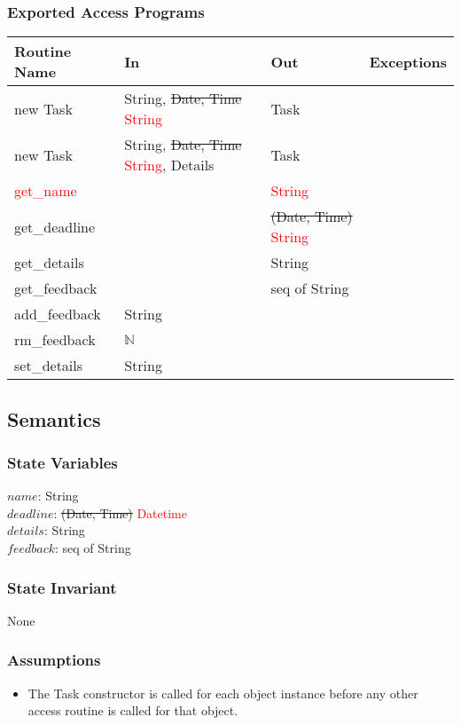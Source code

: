 \documentclass[12pt, titlepage]{article}
\begin{document}
\subsubsection* {Exported Access Programs}
\begin{tabular}{|l|l|l|l|}
    \hline
    \textbf{Routine Name} & \textbf{In} & \textbf{Out} & \textbf{Exceptions} \\
    \hline
    new Task & String, \sout{Date, Time} \textcolor{red}{String} & Task & \\
    \hline
    new Task & String, \sout{Date, Time} \textcolor{red}{String}, Details & Task & \\
    \hline
    \textcolor{red}{get\_name} & & \textcolor{red}{String} & \\
    \hline
    get\_deadline & & \sout{(Date, Time)} \textcolor{red}{String} & \\
    \hline
    get\_details & & String & \\
    \hline
    get\_feedback & & seq of String& \\
    \hline
    add\_feedback & String & & \\
    \hline
    rm\_feedback & $\mathbb{N}$ &&\\
    \hline
    set\_details & String & & \\
    \hline
\end{tabular}

\subsection*{Semantics}
\subsubsection*{State Variables}
$name$: String\\
$deadline$: \sout{(Date, Time)} \textcolor{red}{Datetime}\\
$details$: String\\
$feedback$: seq of String

\subsubsection*{State Invariant}
None

\subsubsection*{Assumptions}
\begin{itemize}
  \item The Task constructor is called for each object instance before any other access routine is called for that object.
\end{itemize}
\end{document}
